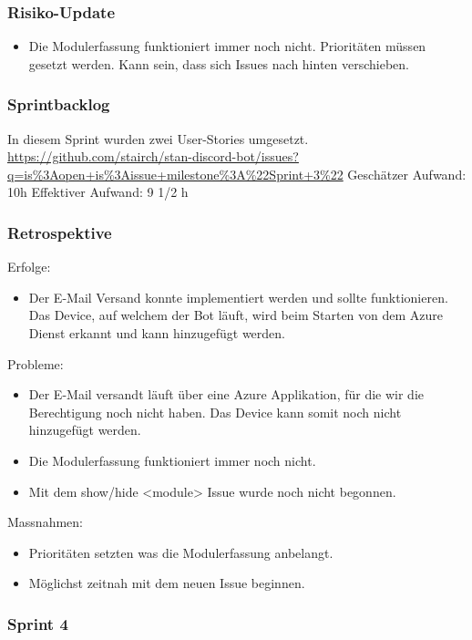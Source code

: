 \documentclass[a4paper, table]{article}
\begin{document}
\subsubsection*{Risiko-Update}
\begin{itemize}
    \item Die Modulerfassung funktioniert immer noch nicht.
    Prioritäten müssen gesetzt werden.
    Kann sein, dass sich Issues nach hinten verschieben.
\end{itemize}

\subsubsection*{Sprintbacklog}
In diesem Sprint wurden zwei User-Stories umgesetzt.\\
\url{https://github.com/stairch/stan-discord-bot/issues?q=is%3Aopen+is%3Aissue+milestone%3A%22Sprint+3%22}
\newline
Geschätzer Aufwand: 10h
\newline
Effektiver Aufwand: 9 1/2 h

\subsubsection*{Retrospektive}
Erfolge:
\begin{itemize}
    \item Der E-Mail Versand konnte implementiert werden und sollte funktionieren.
    Das Device, auf welchem der Bot läuft, wird beim Starten von dem Azure Dienst erkannt und kann hinzugefügt werden.
\end{itemize}
Probleme:
\begin{itemize}
    \item Der E-Mail versandt läuft über eine Azure Applikation, für die wir die Berechtigung noch nicht haben.
    Das Device kann somit noch nicht hinzugefügt werden.
    \item Die Modulerfassung funktioniert immer noch nicht.
    \item Mit dem show/hide <module> Issue wurde noch nicht begonnen.
\end{itemize}
Massnahmen:
\begin{itemize}
    \item Prioritäten setzten was die Modulerfassung anbelangt.
    \item Möglichst zeitnah mit dem neuen Issue beginnen.
\end{itemize}

\newpage
\subsubsection{Sprint 4}
\end{document}
